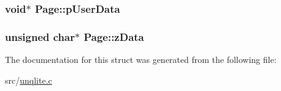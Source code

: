 \hypertarget{struct_page_aa1e91f31c9d426367c0fe43a8e4ee5b3}{
\subsubsection[{p\-User\-Data}]{\setlength{\rightskip}{0pt plus 5cm}void$\ast$ Page\-::p\-User\-Data}}\label{df/d9b/struct_page_aa1e91f31c9d426367c0fe43a8e4ee5b3}
\hypertarget{struct_page_a87938872ca8631cd16a3a10e6256f9ab}{
\subsubsection[{z\-Data}]{\setlength{\rightskip}{0pt plus 5cm}unsigned char$\ast$ Page\-::z\-Data}}\label{df/d9b/struct_page_a87938872ca8631cd16a3a10e6256f9ab}


The documentation for this struct was generated from the following file\-:\begin{DoxyCompactItemize}
\item 
src/\hyperlink{unqlite_8c}{unqlite.\-c}\end{DoxyCompactItemize}
